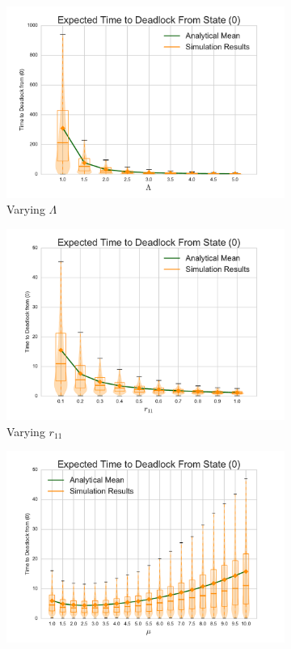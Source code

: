 \documentclass{article}
\begin{document}
\begin{figure}[!htbp]
\begin{subfigure}[b]{0.5\textwidth}
  \includegraphics[width=\textwidth]{images/varyL}
  \caption{Varying $\Lambda$}
  \label{fig:timestodeadlock_L}
\end{subfigure}
\begin{subfigure}[b]{0.5\textwidth}
  \includegraphics[width=\textwidth]{images/varyr11}
  \caption{Varying $r_{11}$}
  \label{fig:timestodeadlock_r11}
\end{subfigure}
\begin{subfigure}[b]{0.5\textwidth}
  \includegraphics[width=\textwidth]{images/varymu}

\end{subfigure}
\end{figure}
\end{document}
